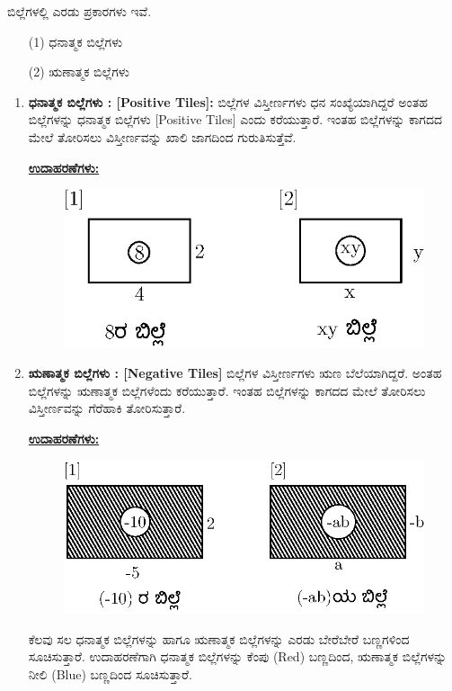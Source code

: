 ಬಿಲ್ಲೆಗಳಲ್ಲಿ ಎರಡು ಪ್ರಕಾರಗಳು ಇವೆ. 
\begin{itemize}
\item[(1)] ಧನಾತ್ಮಕ ಬಿಲ್ಲೆಗಳು 
\item[(2)] ಋಣಾತ್ಮಕ ಬಿಲ್ಲೆಗಳು 
\end{itemize}
\begin{enumerate}
\item \textbf{ಧನಾತ್ಮಕ ಬಿಲ್ಲೆಗಳು : [Positive Tiles]:} ಬಿಲ್ಲೆಗಳ ವಿಸ್ತೀರ್ಣಗಳು ಧನ ಸಂಖ್ಯೆಯಾಗಿದ್ದರೆ ಅಂತಹ ಬಿಲ್ಲೆಗಳನ್ನು ಧನಾತ್ಮಕ ಬಿಲ್ಲೆಗಳು [Positive Tiles] ಎಂದು ಕರೆಯುತ್ತಾರೆ. ಇಂತಹ ಬಿಲ್ಲೆಗಳನ್ನು ಕಾಗದದ ಮೇಲೆ ತೋರಿಸಲು ವಿಸ್ತೀರ್ಣವನ್ನು ಖಾಲಿ ಜಾಗದಿಂದ ಗುರುತಿಸುತ್ತೆವೆ. 
 
\eject

\noindent
{\textbf{\underline{ಉದಾಹರಣೆಗಳು: }}}
\begin{figure}[H]
\centering
\includegraphics[scale=0.8]{src/figure/chap3/fig3-2.eps}
\end{figure}

\item \textbf{ಋಣಾತ್ಮಕ ಬಿಲ್ಲೆಗಳು : [Negative Tiles]} ಬಿಲ್ಲೆಗಳ ವಿಸ್ತೀರ್ಣಗಳು ಋಣ ಬೆಲೆಯಾಗಿದ್ದರೆ. ಅಂತಹ ಬಿಲ್ಲೆಗಳನ್ನು ಋಣಾತ್ಮಕ ಬಿಲ್ಲೆಗಳೆಂದು ಕರೆಯುತ್ತಾರೆ. ಇಂತಹ ಬಿಲ್ಲೆಗಳನ್ನು ಕಾಗದದ ಮೇಲೆ ತೋರಿಸಲು ವಿಸ್ತೀರ್ಣವನ್ನು ಗೆರೆಹಾಕಿ ತೋರಿಸುತ್ತಾರೆ.

\noindent
{\textbf{\underline{ಉದಾಹರಣೆಗಳು: }}}
\begin{figure}[H]
\centering
\includegraphics[scale=0.8]{src/figure/chap3/fig3-3.eps}
\end{figure}

ಕೆಲವು ಸಲ ಧನಾತ್ಮಕ ಬಿಲ್ಲೆಗಳನ್ನು ಹಾಗೂ ಋಣಾತ್ಮಕ ಬಿಲ್ಲೆಗಳನ್ನು ಎರಡು ಬೇರೆಬೇರೆ ಬಣ್ಣಗಳಿಂದ ಸೂಚಿಸುತ್ತಾರೆ. ಉದಾಹರಣೆಗಾಗಿ ಧನಾತ್ಮಕ ಬಿಲ್ಲೆಗಳನ್ನು ಕೆಂಪು (Red) ಬಣ್ಣದಿಂದ, ಋಣಾತ್ಮಕ ಬಿಲ್ಲೆಗಳನ್ನು ನೀಲಿ (Blue) ಬಣ್ಣದಿಂದ ಸೂಚಿಸುತ್ತಾರೆ.
\end{enumerate}

